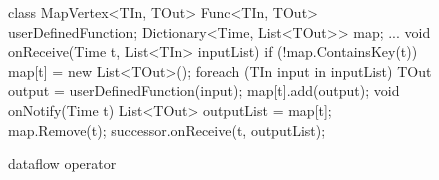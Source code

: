 \begin{figure}[t!]
\begin{numcodejava}
class MapVertex<TIn, TOut> {
  Func<TIn, TOut> userDefinedFunction;
  Dictionary<Time, List<TOut>> map;
  ...
  void onReceive(Time t, List<TIn> inputList) {
    if (!map.ContainsKey(t))
       map[t] = new List<TOut>();
    foreach (TIn input in inputList) {
      TOut output = userDefinedFunction(input);
      map[t].add(output);
    }
  }
  void onNotify(Time t) {
     List<TOut> outputList = map[t];
     map.Remove(t);
     successor.onReceive(t, outputList); 
  }
}
\end{numcodejava}
\caption{ dataflow operator}
\label{fig:motivating-eg}
\end{figure}

